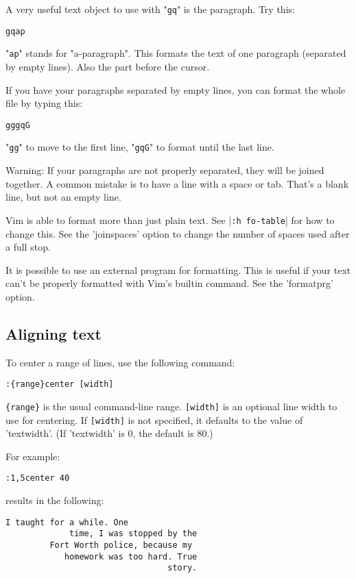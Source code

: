A very useful text object to use with "\verb!gq!" is the paragraph.
Try this:

\begin{Verbatim}[samepage=true]
 gqap
\end{Verbatim}

"\verb!ap!" stands for "a-paragraph".
This formats the text of one paragraph (separated by empty lines).
Also the part before the cursor.

If you have your paragraphs separated by empty lines, you can format the whole file by typing this:

\begin{Verbatim}[samepage=true]
 gggqG
\end{Verbatim}

"\verb!gg!" to move to the first line, "\verb!gqG!" to format until the last line.

Warning: If your paragraphs are not properly separated, they will be joined together.
A common mistake is to have a line with a space or tab.
That's a blank line, but not an empty line.

Vim is able to format more than just plain text.
See |\verb!:h fo-table!| for how to change this.
See the 'joinspaces' option to change the number of spaces used after a full stop.

It is possible to use an external program for formatting.
This is useful if your text can't be properly formatted with Vim's builtin command.
See the 'formatprg' option.
\subsection{Aligning text}
To center a range of lines, use the following command:

\begin{Verbatim}[samepage=true]
 :{range}center [width]
\end{Verbatim}

\verb!{range}! is the usual command-line range.
\verb![width]! is an optional line width to use for centering.
If \verb![width]! is not specified, it defaults to the value of 'textwidth'.
(If 'textwidth' is 0, the default is 80.)

For example:

\begin{Verbatim}[samepage=true]
 :1,5center 40
\end{Verbatim}

results in the following:

\begin{Verbatim}[samepage=true]
			 I taught for a while. One 
			 time, I was stopped by the 
		 Fort Worth police, because my 
			homework was too hard. True 
								 story. 
\end{Verbatim}
